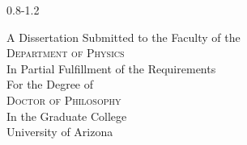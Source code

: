 \begin{titlingpage*}
\thispagestyle{empty}
\calccentering\unitlength
\begin{adjustwidth}{0.8\unitlength}{-1.2\unitlength}
\centering
  \maketitle
  A Dissertation Submitted to the Faculty of the\\
  {\scshape Department of Physics}\\
  In Partial Fulfillment of the Requirements\\
  For the Degree of\\
  \textsc{Doctor of Philosophy}\\
  In the Graduate College\\
  University of Arizona\\
  \bigskip
\end{adjustwidth}
\end{titlingpage*}
